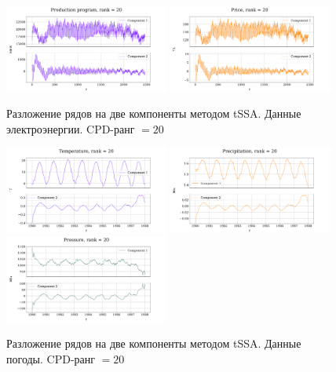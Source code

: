 	\begin{figure}[h!]
		\centering
		\includegraphics[width=0.48\textwidth, keepaspectratio]{../../experiments/electricity/tssa/figs/decomposition/cpd_rank_20/Production_program.png}
		\includegraphics[width=0.48\textwidth, keepaspectratio]{../../experiments/electricity/tssa/figs/decomposition/cpd_rank_20/Price.png}
		\caption{Разложение рядов на две компоненты методом tSSA. Данные электроэнергии. CPD-ранг $ = 20 $}\label{fig:electr_decomp_tssa}
	\end{figure}
	
	\begin{figure}[h!]
		\centering
		\includegraphics[width=0.48\textwidth, keepaspectratio]{../../experiments/weather/tssa/figs/decomposition/cpd_rank_20/Temperature.png}
		\includegraphics[width=0.48\textwidth, keepaspectratio]{../../experiments/weather/tssa/figs/decomposition/cpd_rank_20/Precipitation.png}
		\includegraphics[width=0.48\textwidth, keepaspectratio]{../../experiments/weather/tssa/figs/decomposition/cpd_rank_20/Pressure.png}
		\caption{Разложение рядов на две компоненты методом tSSA. Данные погоды. CPD-ранг $ = 20 $}\label{fig:weather_decomp_tssa}
	\end{figure}
	
